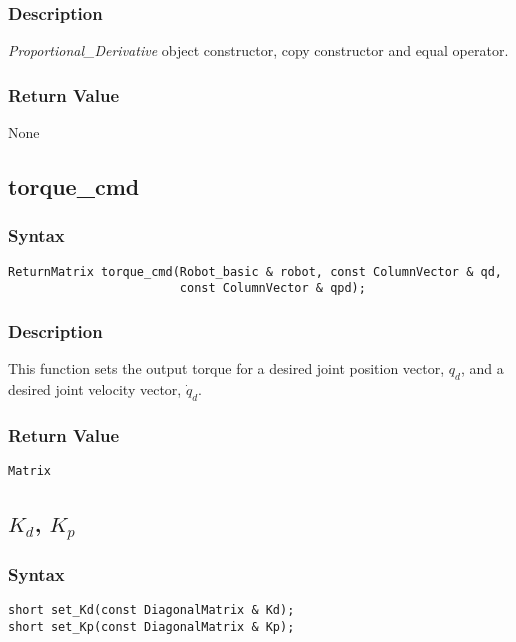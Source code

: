 \documentclass[dvips,11pt,fleqn]{report}
\begin{document}
\subsubsection*{Description}   
\emph{Proportional\_Derivative} object constructor, copy constructor
and equal operator.

\subsubsection*{Return Value}

None

\newpage

\subsection*{torque\_cmd}
\subsubsection*{Syntax}
\begin{verbatim}
ReturnMatrix torque_cmd(Robot_basic & robot, const ColumnVector & qd,
                        const ColumnVector & qpd);
\end{verbatim}

\subsubsection*{Description}   
This function sets the output torque for a desired joint position
vector, $q_d$, and a desired joint velocity vector, $\dot{q}_d$.

\subsubsection*{Return Value}

\texttt{Matrix}

\newpage

\subsection*{$K_d$, $K_p$}
\subsubsection*{Syntax}
\begin{verbatim}
short set_Kd(const DiagonalMatrix & Kd);
short set_Kp(const DiagonalMatrix & Kp);
\end{verbatim}
\end{document}
